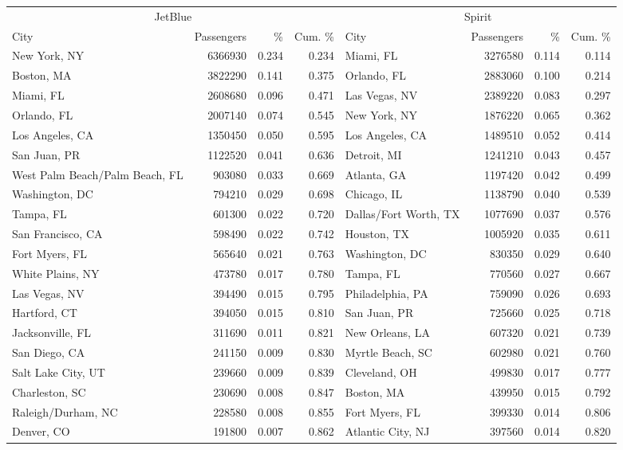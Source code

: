 
\begin{tabular}{lrrrlrrr}
\toprule
\multicolumn{4}{c}{JetBlue} & \multicolumn{4}{c}{Spirit} \\
\cmidrule(l{3pt}r{3pt}){1-4} \cmidrule(l{3pt}r{3pt}){5-8}
City & Passengers & \% & Cum. \% & City & Passengers & \% & Cum. \%\\
\midrule
New York, NY & 6366930 & 0.234 & 0.234 & Miami, FL & 3276580 & 0.114 & 0.114\\
Boston, MA & 3822290 & 0.141 & 0.375 & Orlando, FL & 2883060 & 0.100 & 0.214\\
Miami, FL & 2608680 & 0.096 & 0.471 & Las Vegas, NV & 2389220 & 0.083 & 0.297\\
Orlando, FL & 2007140 & 0.074 & 0.545 & New York, NY & 1876220 & 0.065 & 0.362\\
Los Angeles, CA & 1350450 & 0.050 & 0.595 & Los Angeles, CA & 1489510 & 0.052 & 0.414\\
\addlinespace
San Juan, PR & 1122520 & 0.041 & 0.636 & Detroit, MI & 1241210 & 0.043 & 0.457\\
West Palm Beach/Palm Beach, FL & 903080 & 0.033 & 0.669 & Atlanta, GA & 1197420 & 0.042 & 0.499\\
Washington, DC & 794210 & 0.029 & 0.698 & Chicago, IL & 1138790 & 0.040 & 0.539\\
Tampa, FL & 601300 & 0.022 & 0.720 & Dallas/Fort Worth, TX & 1077690 & 0.037 & 0.576\\
San Francisco, CA & 598490 & 0.022 & 0.742 & Houston, TX & 1005920 & 0.035 & 0.611\\
\addlinespace
Fort Myers, FL & 565640 & 0.021 & 0.763 & Washington, DC & 830350 & 0.029 & 0.640\\
White Plains, NY & 473780 & 0.017 & 0.780 & Tampa, FL & 770560 & 0.027 & 0.667\\
Las Vegas, NV & 394490 & 0.015 & 0.795 & Philadelphia, PA & 759090 & 0.026 & 0.693\\
Hartford, CT & 394050 & 0.015 & 0.810 & San Juan, PR & 725660 & 0.025 & 0.718\\
Jacksonville, FL & 311690 & 0.011 & 0.821 & New Orleans, LA & 607320 & 0.021 & 0.739\\
\addlinespace
San Diego, CA & 241150 & 0.009 & 0.830 & Myrtle Beach, SC & 602980 & 0.021 & 0.760\\
Salt Lake City, UT & 239660 & 0.009 & 0.839 & Cleveland, OH & 499830 & 0.017 & 0.777\\
Charleston, SC & 230690 & 0.008 & 0.847 & Boston, MA & 439950 & 0.015 & 0.792\\
Raleigh/Durham, NC & 228580 & 0.008 & 0.855 & Fort Myers, FL & 399330 & 0.014 & 0.806\\
Denver, CO & 191800 & 0.007 & 0.862 & Atlantic City, NJ & 397560 & 0.014 & 0.820\\
\bottomrule
\end{tabular}
